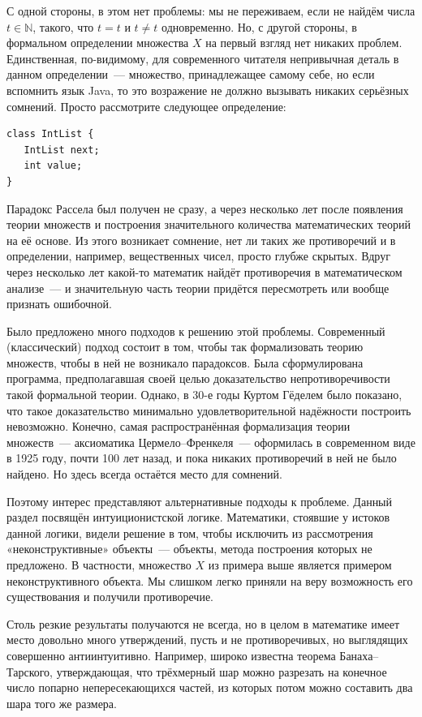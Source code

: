 \documentclass[a4paper,11pt]{article}
\theoremstyle{definition}
\begin{document}
С одной стороны, в этом нет проблемы: мы не переживаем, если не найдём числа $t
\in \mathbb{N}$, такого, что $t = t$ и $t \ne t$ одновременно. Но, с другой
стороны, в формальном определении множества $X$ на первый взгляд нет никаких
проблем. Единственная, по-видимому, для современного читателя непривычная
деталь в данном определении~--- множество, принадлежащее самому себе, но если
вспомнить язык Java, то это возражение не должно вызывать никаких серьёзных
сомнений. Просто рассмотрите следующее определение:
\begin{verbatim}
class IntList {
   IntList next;
   int value;
}
\end{verbatim}

Парадокс Рассела был получен не сразу, а через несколько лет после появления
теории множеств и построения значительного количества математических теорий на
её основе. Из этого возникает сомнение, нет ли таких же противоречий и в
определении, например, вещественных чисел, просто глубже скрытых. Вдруг через
несколько лет какой-то математик найдёт противоречия в математическом анализе~---
и значительную часть теории придётся пересмотреть или вообще признать
ошибочной.

Было предложено много подходов к решению этой проблемы. Современный
(классический) подход состоит в том, чтобы так формализовать теорию множеств,
чтобы в ней не возникало парадоксов. Была сформулирована программа,
предполагавшая своей целью доказательство непротиворечивости такой формальной
теории. Однако, в 30-е годы Куртом Гёделем было показано, что такое
доказательство минимально удовлетворительной надёжности построить невозможно.
Конечно, самая распространённая формализация теории множеств~--- аксиоматика
Цермело--Френкеля~--- оформилась в современном виде в 1925 году, почти 100 лет
назад, и пока никаких противоречий в ней не было найдено. Но здесь всегда
остаётся место для сомнений.

Поэтому интерес представляют альтернативные подходы к проблеме. Данный раздел
посвящён интуиционистской логике. Математики, стоявшие у истоков данной логики,
видели решение в том, чтобы исключить из рассмотрения «неконструктивные»
объекты~--- объекты, метода построения которых не предложено. В частности,
множество $X$ из примера выше является примером неконструктивного объекта. Мы
слишком легко приняли на веру возможность его существования и получили
противоречие.

Столь резкие результаты получаются не всегда, но в целом в математике имеет
место довольно много утверждений, пусть и не противоречивых, но выглядящих
совершенно антиинтуитивно. Например, широко известна теорема Банаха--Тарского,
утверждающая, что трёхмерный шар можно разрезать на конечное число попарно
непересекающихся частей, из которых потом можно составить два шара того же
размера.
\end{document}
